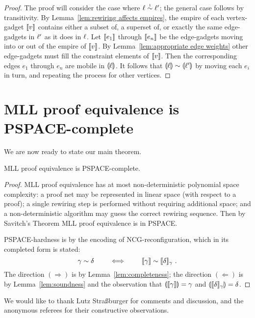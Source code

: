 \documentclass{lmcs}
\let\capsabbrev=\uppercase
\begin{document}
\begin{proof}
The proof will consider the case where $\links\perm*\links'$; the general case follows by transitivity.
%
By Lemma~\ref{lem:rewiring affects empires}, the empire of each vertex-gadget $\llbracket v\rrbracket$ contains either a subset of, a superset of, or exactly the same edge-gadgets in $\ell'$ as it does in $\ell$.
%
Let $\llbracket e_1\rrbracket$ through $\llbracket e_n\rrbracket$ be the edge-gadgets moving into or out of the empire of $\llbracket v\rrbracket$.
%
By Lemma~\ref{lem:appropriate edge weights} other edge-gadgets must fill the constraint elements of $\llbracket v\rrbracket$.
%
Then the corresponding edges $e_1$ through $e_n$ are mobile in $\llparenthesis\ell\rrparenthesis$.
%
It follows that $\coitn\links\perm\coitn{\links'}$ by moving each $e_i$ in turn, and repeating the process for other vertices.
%
\end{proof}





\section{\capsabbrev{mll} proof equivalence is \capsabbrev{pspace}-complete}


%
We are now ready to state our main theorem.


\begin{theorem}
\capsabbrev{mll} proof equivalence is \capsabbrev{pspace}-complete.
\end{theorem}

\begin{proof}
\capsabbrev{mll} proof equivalence has at most non-deterministic polynomial space complexity: a proof net may be represented in linear space (with respect to a proof); a single rewiring step is performed without requiring additional space; and a non-deterministic algorithm may guess the correct rewiring sequence.
%
Then by Savitch's Theorem \cite{Savitch-1970} \capsabbrev{mll} proof equivalence is in \capsabbrev{pspace}.


\capsabbrev{pspace}-hardness is by the encoding of \capsabbrev{ncg}-reconfiguration, which in its completed form is stated:
\[
	\gamma\perm\delta \qquad\iff\qquad \itn\gamma\perm\itn\delta_\gamma~.
\]
%
The direction $(\Rightarrow)$ is by Lemma~\ref{lem:completeness}; the direction $(\Leftarrow)$ is by Lemma~\ref{lem:soundness} and the observation that $\llparenthesis\llbracket\gamma\rrbracket\rrparenthesis=\gamma$ and $\llparenthesis\llbracket\delta\rrbracket_\gamma\rrparenthesis=\delta$.
%
\end{proof}

\newpage


We would like to thank Lutz Stra{\ss}burger for comments and discussion, and the anonymous referees for their constructive observations.



\end{document}
